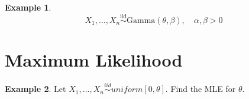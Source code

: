 \documentclass[12pt]{article}
\theoremstyle{definition}
\newtheorem*{example}{Example}
\begin{document}
\begin{example}
$$ X_1, \ldots, X_n \overset{\text{iid}}{\sim} \text{Gamma}(\theta, \beta), \quad \alpha, \beta > 0$$
\end{example}



\section{Maximum Likelihood}

\begin{example}
Let $X_1, \ldots, X_n \overset{iid}{\sim} uniform[0,\theta]$. Find the MLE for $\theta$.
\end{example}
\end{document}
